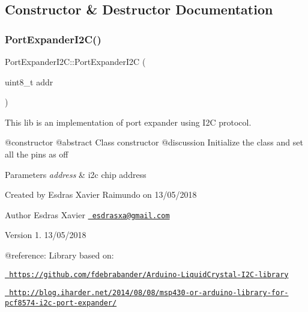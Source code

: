 \subsection{Constructor \& Destructor Documentation}
\mbox{\label{classPortExpanderI2C_ae4f051ad2540a810dfd9edaa8e03c5f7}} 
\subsubsection{\texorpdfstring{PortExpanderI2C()}{PortExpanderI2C()}}
{\footnotesize\ttfamily Port\+Expander\+I2\+C\+::\+Port\+Expander\+I2C (\begin{DoxyParamCaption}\item[{uint8\+\_\+t}]{addr }\end{DoxyParamCaption})}



This lib is an implementation of port expander using I2C protocol. 

@constructor @abstract Class constructor @discussion Initialize the class and set all the pins as off 
\begin{DoxyParams}{Parameters}
{\em address} & i2c chip address\\
\hline
\end{DoxyParams}
Created by Esdras Xavier Raimundo on 13/05/2018 \begin{DoxyAuthor}{Author}
Esdras Xavier \href{mailto:esdrasxa@gmail.com}{\texttt{ esdrasxa@gmail.\+com}} 
\end{DoxyAuthor}
\begin{DoxyVersion}{Version}
1. 13/05/2018
\end{DoxyVersion}
@reference\+: Library based on\+:
\begin{DoxyItemize}
\item \href{https://github.com/fdebrabander/Arduino-LiquidCrystal-I2C-library}{\texttt{ https\+://github.\+com/fdebrabander/\+Arduino-\/\+Liquid\+Crystal-\/\+I2\+C-\/library}}
\item \href{http://blog.iharder.net/2014/08/08/msp430-or-arduino-library-for-pcf8574-i2c-port-expander/}{\texttt{ http\+://blog.\+iharder.\+net/2014/08/08/msp430-\/or-\/arduino-\/library-\/for-\/pcf8574-\/i2c-\/port-\/expander/}} 
\end{DoxyItemize}\mbox{\label{classPortExpanderI2C_a0720aaddf0dee2b43435b2df22a52a25}} 
